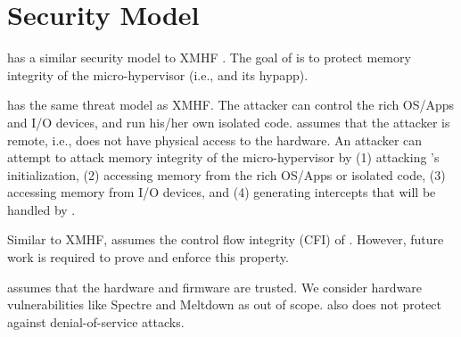 \section{Security Model}
\label{sec:security_model}

 has a similar security model to XMHF \cite{vasudevan2013design}. The goal of  is to protect memory integrity of the micro-hypervisor (i.e.,  and its hypapp).

 has the same threat model as XMHF. The attacker can control the rich OS/Apps and I/O devices, and run his/her own isolated code.  assumes that the attacker is remote, i.e., does not have physical access to the hardware. An attacker can attempt to attack memory integrity of the micro-hypervisor by (1) attacking 's initialization, (2) accessing memory from the rich OS/Apps or isolated code, (3) accessing memory from I/O devices, and (4) generating intercepts that will be handled by .

Similar to XMHF,  assumes the control flow integrity (CFI) of . However, future work is required to prove and enforce this property.

 assumes that the hardware and firmware are trusted. We consider hardware vulnerabilities like Spectre \cite{kocher2020spectre} and Meltdown \cite{lipp2018meltdown} as out of scope.  also does not protect against denial-of-service attacks.

